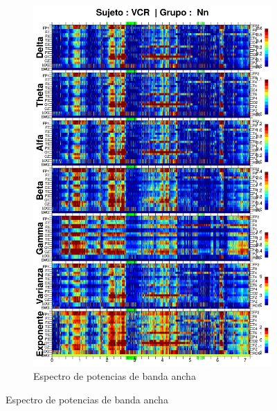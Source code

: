 \begin{figure}
\ContinuedFloat
\begin{subfigure}{\linewidth}
\centering
\includegraphics[width=0.9\linewidth]
{./img_resultados/VCNNS1_espectral_total.png} 
\caption{Espectro de potencias de banda ancha}
\end{subfigure}
\end{figure}

